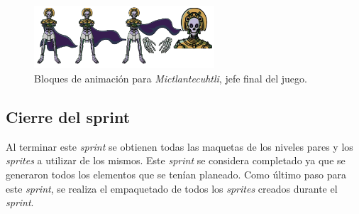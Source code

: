 \begin{figure}[h]
    \centering
    \includegraphics[width=0.6\textwidth]{03TrabajoRealizado/imagenes/Mictlantecuhtli.png}
     \caption{Bloques de animación para \textit{Mictlantecuhtli}, jefe final del juego.}
    \label{fig:Mictlantecutli}        
\end{figure}

\subsection{Cierre del sprint}
Al terminar este \textit{sprint} se obtienen todas las maquetas de los niveles
pares y los \textit{sprites} a utilizar de los mismos. Este \textit{sprint} se
considera completado ya que se generaron todos los elementos que se tenían
planeado. Como último paso para este \textit{sprint}, se realiza el empaquetado
de todos los \textit{sprites} creados durante el \textit{sprint}.

